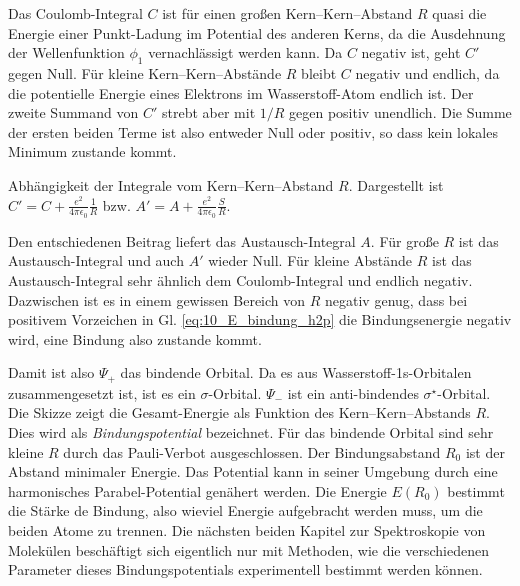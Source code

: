 Das Coulomb-Integral $C$ ist für einen  großen Kern--Kern--Abstand $R$ quasi die Energie einer Punkt-Ladung im Potential des anderen Kerns, da die Ausdehnung der Wellenfunktion $\phi_1$ vernachlässigt werden kann. Da $C$ negativ ist, geht $C'$ gegen Null. Für kleine Kern--Kern--Abstände $R$ bleibt $C$ negativ und endlich, da die potentielle Energie eines Elektrons im Wasserstoff-Atom endlich ist. Der zweite Summand von  $C'$ strebt aber mit $1/R$ gegen positiv unendlich. Die Summe der ersten beiden Terme ist also entweder Null oder positiv, so dass kein lokales Minimum zustande kommt.



\begin{marginfigure}

\caption{Abhängigkeit der Integrale vom Kern--Kern--Abstand $R$. Dargestellt ist 
$C' = C  + \frac{e^2}{4 \pi \epsilon_0} \frac{1 }{R}$ bzw. $A' = A   + \frac{e^2}{4 \pi \epsilon_0} \frac{ S }{R}$. \label{fig:10_H2_integrale_r}
 }
\end{marginfigure}



Den entschiedenen Beitrag liefert das Austausch-Integral $A$. Für große $R$ ist das Austausch-Integral und auch $A'$ wieder Null. Für kleine Abstände $R$ ist das Austausch-Integral sehr ähnlich dem Coulomb-Integral und endlich negativ. Dazwischen ist es in einem gewissen Bereich von $R$ negativ genug, dass bei positivem Vorzeichen in Gl. \ref{eq:10_E_bindung_h2p} die Bindungsenergie negativ wird, eine Bindung also zustande kommt.

Damit ist also $\Psi_+$ das bindende Orbital. Da es aus Wasserstoff-1s-Orbitalen zusammengesetzt ist, ist es ein $\sigma$-Orbital. $\Psi_-$ ist ein anti-bindendes $\sigma^\star$-Orbital. Die Skizze zeigt die Gesamt-Energie als Funktion des Kern--Kern--Abstands $R$. Dies wird als \emph{Bindungspotential} bezeichnet. Für das bindende Orbital sind sehr kleine $R$ durch das Pauli-Verbot ausgeschlossen.
Der Bindungsabstand $R_0$ ist der Abstand minimaler Energie. Das Potential kann in seiner Umgebung durch eine harmonisches Parabel-Potential genähert werden. Die Energie $E(R_0)$ bestimmt die Stärke de Bindung, also wieviel Energie aufgebracht werden muss, um die beiden Atome zu trennen. Die nächsten beiden Kapitel zur Spektroskopie von Molekülen beschäftigt sich eigentlich nur mit Methoden, wie die verschiedenen Parameter dieses Bindungspotentials experimentell bestimmt werden können.



